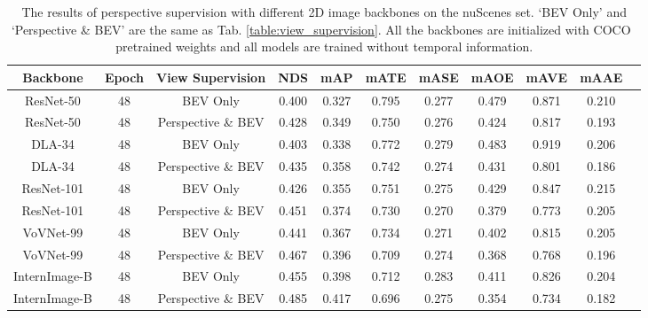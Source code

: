 \documentclass[10pt,twocolumn,letterpaper]{article}
\begin{document}
\setlength{\tabcolsep}{3pt}
\setlength{\doublerulesep}{2\arrayrulewidth}
\renewcommand{\arraystretch}{1.1}
\begin{table*}[ht]
    \caption{The results of perspective supervision with different 2D image backbones on the nuScenes  set. `BEV Only' and `Perspective \& BEV' are the same as Tab. \ref{table:view_supervision}. All the backbones are initialized with COCO~\cite{COCO} pretrained weights and all models are trained without temporal information.}
    \label{table:large_backbone}
    \centering

    \begin{tabular}{c|c|c|cc|cccccc}
        \toprule
        Backbone & Epoch & View Supervision & NDS & mAP & mATE & mASE & mAOE & mAVE & mAAE   \\ 
        \midrule
        ResNet-50 & 48 & BEV Only & 0.400 & 0.327 & 0.795 & 0.277 & 0.479 &0.871 & 0.210 \\ 
        ResNet-50 & 48 & Perspective \& BEV & 0.428 & 0.349 & 0.750 & 0.276 & 0.424 & 0.817 & 0.193 \\
        \midrule
        DLA-34 & 48 & BEV Only & 0.403 & 0.338 & 0.772 & 0.279 & 0.483 & 0.919 & 0.206 \\ 
        DLA-34 & 48 & Perspective \& BEV & 0.435 & 0.358 & 0.742 & 0.274 & 0.431 & 0.801 & 0.186 \\  
  
        \midrule
        ResNet-101 & 48 & BEV Only & 0.426 & 0.355 & 0.751 & 0.275 & 0.429 & 0.847 & 0.215  \\ 
        ResNet-101 & 48 & Perspective \& BEV & 0.451 & 0.374 & 0.730 & 0.270 & 0.379 & 0.773 & 0.205  \\   
        \midrule
        VoVNet-99 & 48 & BEV Only & 0.441 & 0.367  & 0.734 & 0.271 & 0.402 & 0.815  & 0.205 \\ 
        VoVNet-99 & 48 & Perspective \& BEV & 0.467 & 0.396  & 0.709  & 0.274 & 0.368 & 0.768 & 0.196 \\ 
        \midrule
        InternImage-B & 48 & BEV Only & 0.455 & 0.398  & 0.712 & 0.283 & 0.411 & 0.826  & 0.204 \\ 
        InternImage-B & 48 & Perspective \& BEV & 0.485 & 0.417  & 0.696  & 0.275 & 0.354 & 0.734 & 0.182 \\ 
        \bottomrule
    \end{tabular}
    
\end{table*} \setlength{\tabcolsep}{3pt}
\setlength{\doublerulesep}{2\arrayrulewidth}
\renewcommand{\arraystretch}{1.1}
\end{document}
